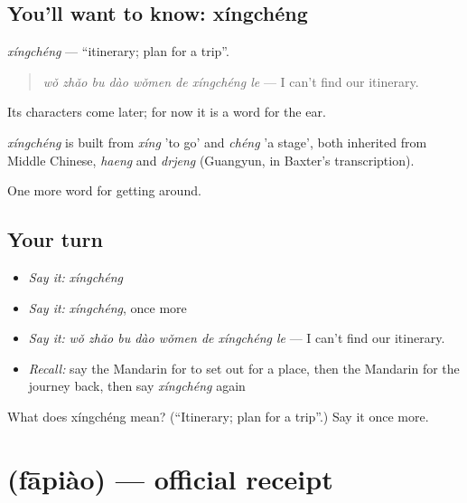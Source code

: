 \subsection*{You'll want to know: xíngchéng}
\emph{xíngchéng} — \textquotedblleft{}itinerary; plan for a trip\textquotedblright{}.

\begin{quote}
\emph{wǒ zhǎo bu dào wǒmen de xíngchéng le} — I can't find our itinerary.
\end{quote}

Its characters come later; for now it is a word for the ear.

\begin{cousinweb}
\emph{xíngchéng} is built from \emph{xíng} 'to go' and \emph{chéng} 'a stage', both inherited from Middle Chinese, \emph{haeng} and \emph{drjeng} (Guangyun, in Baxter's transcription).
\end{cousinweb}

\begin{grammarlens}[title={What you've built}]
One more word for getting around.
\end{grammarlens}

\subsection*{Your turn}
\begin{itemize}
\raggedright
  \item \emph{Say it:} \emph{xíngchéng}
  \item \emph{Say it:} \emph{xíngchéng}, once more
  \item \emph{Say it:} \emph{wǒ zhǎo bu dào wǒmen de xíngchéng le} — I can't find our itinerary.
  \item \emph{Recall:} say the Mandarin for to set out for a place, then the Mandarin for the journey back, then say \emph{xíngchéng} again
\end{itemize}

\begin{tcolorbox}[breakable,colback=teal!4,colframe=teal!35!black,title={Before you move on}]
What does xíngchéng mean? (\textquotedblleft{}Itinerary; plan for a trip\textquotedblright{}.) Say it once more.
\end{tcolorbox}
\section[\texorpdfstring{\zh{发票} (fāpiào)}{发票 (fāpiào)}]{ (fāpiào) — official receipt}

